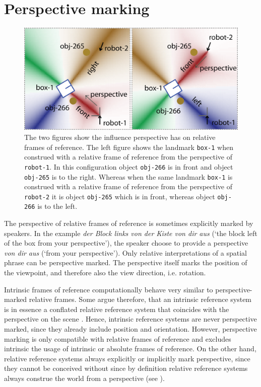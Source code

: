 \section{Perspective marking}

\begin{figure}
\begin{center}
\includegraphics[width=0.7\columnwidth]{figs/space-scene-3-influence-perspective.png}
\caption[Influence of perspective on relative frames of reference.]
{The two figures show the influence perspective has on relative frames of reference.
The left figure shows the landmark {\footnotesize\tt box-1} when construed with a relative frame of reference
from the perspective of {\footnotesize\tt robot-1}. 
In this configuration object {\footnotesize\tt obj-266} is in front and object {\footnotesize\tt obj-265} is to the right.
Whereas when the same landmark {\footnotesize\tt box-1} is construed with a relative frame of reference
from the perspective of {\footnotesize\tt robot-2} it is object {\footnotesize\tt obj-265} which is in front,
whereas object {\footnotesize\tt obj-266} is to the left.}
\label{f:influence-perspective}
\end{center}
\end{figure}

The perspective of relative frames of reference is sometimes explicitly marked
by speakers. In the example \textit{der Block links von der Kiste von dir aus} (`the block left of the box from your perspective'),
the speaker choose to provide a perspective \textit{von dir aus} (`from your
perspective'). Only relative interpretations of a spatial phrase can be perspective 
marked. The perspective itself marks the position of the viewpoint, and therefore 
also the view direction, i.e. rotation. 

Intrinsic frames of reference computationally behave very similar to perspective-marked 
relative frames. Some argue therefore, that an intrinsic reference system is in essence a 
conflated relative reference system that coincides with the perspective 
on the scene \citep{levinson1996language}. 
Hence, intrinsic reference systems are never perspective marked, since they already 
include position and orientation. However, perspective marking is only compatible with relative 
frames of reference and excludes intrinsic the usage
of intrinsic or absolute frames of reference. 
On the other hand, relative reference systems always explicitly or implicitly mark 
perspective, since they cannot be conceived without since by definition relative 
reference systems always construe the world from a perspective (see
).

